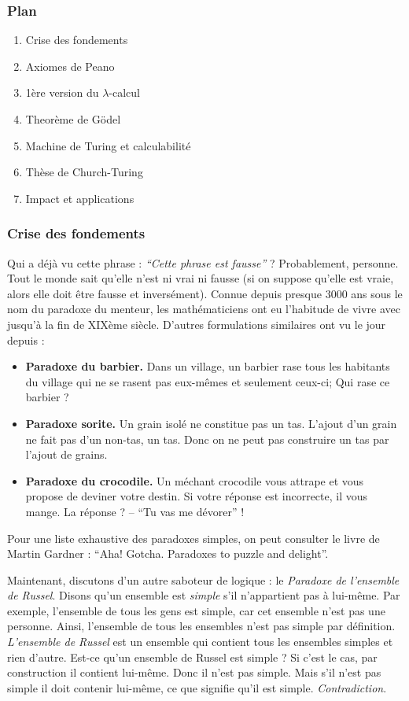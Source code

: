 \documentclass[12pt, a4paper]{article}
\begin{document}
\subsubsection*{Plan}
\begin{enumerate}
	\item Crise des fondements
	\item Axiomes de Peano
	\item 1ère version du $\lambda$-calcul
	\item Theorème de Gödel
	\item Machine de Turing et calculabilité
	\item Thèse de Church-Turing
	\item Impact et applications
\end{enumerate}


\subsubsection*{Crise des fondements}
Qui a déjà vu cette phrase : \emph{``Cette phrase est fausse''} ?
Probablement, personne.
Tout le monde sait qu'elle n'est ni vrai ni fausse (si on suppose qu'elle est vraie, alors elle doit être fausse et inversément).
Connue depuis presque 3000 ans sous le nom du paradoxe du menteur, les mathématiciens ont eu l'habitude de vivre avec jusqu'à la fin de XIXème siècle.
D'autres formulations similaires ont vu le jour depuis :
\begin{itemize}
	\item \textbf{Paradoxe du barbier.}
		Dans un village, un barbier rase tous les habitants du village qui ne se rasent pas eux-mêmes et seulement ceux-ci; Qui rase ce barbier ?
	\item \textbf{Paradoxe sorite.}
		Un grain isolé ne constitue pas un tas.
		L'ajout d'un grain ne fait pas d'un non-tas, un tas.
		Donc on ne peut pas construire un tas par l'ajout de grains.
	\item \textbf{Paradoxe du crocodile.}
		Un méchant crocodile vous attrape et vous propose de deviner votre destin.
		Si votre réponse est incorrecte, il vous mange.
		La réponse ? -- ``Tu vas me dévorer'' !
\end{itemize}

Pour une liste exhaustive des paradoxes simples, on peut consulter le livre de Martin Gardner : ``Aha! Gotcha. Paradoxes to puzzle and delight''.

Maintenant, discutons d'un autre saboteur de logique : le \emph{Paradoxe de l'ensemble de Russel}.
Disons qu'un ensemble est \emph{simple} s'il n'appartient pas à lui-même. Par exemple, l'ensemble de tous les gens est simple, car cet ensemble n'est pas une personne. Ainsi, l'ensemble de tous les ensembles n'est pas simple par définition. \emph{L'ensemble de Russel} est un ensemble qui contient tous les ensembles simples et rien d'autre.
Est-ce qu'un ensemble de Russel est simple ? Si c'est le cas, par construction il contient lui-même. Donc il n'est pas simple. Mais s'il n'est pas simple il doit contenir lui-même, ce que signifie qu'il est simple. \emph{Contradiction}.
\end{document}
